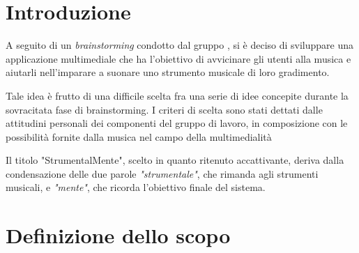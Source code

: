 \section{Introduzione}
A seguito di un \textit{brainstorming} condotto dal gruppo \theteam{}, si è deciso di sviluppare una applicazione multimediale che ha l'obiettivo di avvicinare gli utenti alla musica e aiutarli nell'imparare a suonare uno strumento musicale di loro gradimento.

Tale idea è frutto di una difficile scelta fra una serie di idee concepite durante la sovracitata fase di brainstorming. I criteri di scelta sono stati dettati dalle attitudini personali dei componenti del gruppo di lavoro, in composizione con le possibilità fornite dalla musica nel campo della multimedialità

Il titolo "StrumentalMente", scelto in quanto ritenuto accattivante, deriva dalla condensazione delle due parole \emph{"strumentale"}, che rimanda agli strumenti musicali, e \emph{"mente"}, che ricorda l'obiettivo finale del sistema.

\section{Definizione dello scopo}